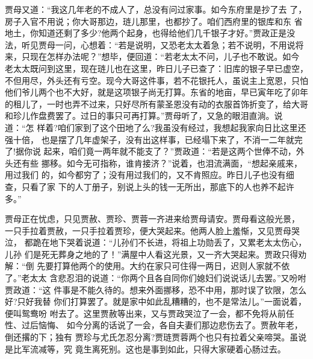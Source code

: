 贾母又道：“我这几年老的不成人了，总没有问过家事。如今东府里是抄了去
了，房子入官不用说；你大哥那边，琏儿那里，也都抄了。咱们西府里的银库和东
省地土，你知道还剩了多少?他两个起身，也得给他们几千银子才好。”贾政正是没
法，听见贾母一问，心想着：“若是说明，又恐老太太着急；若不说明，不用说将
来，只现在怎样办法呢？”想毕，便回道：“若老太太不问，儿子也不敢说。如今
老太太既问到这里，现在琏儿也在这里，昨日儿子已查了：旧库的银子早已虚空，
不但用尽，外头还有亏空。现今大哥这件事，若不花银托人，虽说主上宽恩，只怕
他们爷儿两个也不大好，就是这项银子尚无打算。东省的地亩，早已寅年吃了卯年
的租儿了，一时也弄不过来，只好尽所有蒙圣恩没有动的衣服首饰折变了，给大哥
和珍儿作盘费罢了。过日的事只可再打算。”贾母听了，又急的眼泪直淌。说道：“怎
样着?咱们家到了这个田地了么?我虽没有经过，我想起我家向日比这里还强十倍，
也是摆了几年虚架子，没有出这样事，已经塌下来了，不消一二年就完了!据你说
起来，咱们竟一两年就不能支了？”贾政道：“若是这两个世俸不动，外头还有些
挪移。如今无可指称，谁肯接济？”说着，也泪流满面，“想起亲戚来，用过我们
的，如今都穷了；没有用过我们的，又不肯照应。昨日儿子也没有细查，只看了家
下的人丁册子，别说上头的钱一无所出，那底下的人也养不起许多。”

贾母正在忧虑，只见贾赦、贾珍、贾蓉一齐进来给贾母请安。贾母看这般光景，
一只手拉着贾赦，一只手拉着贾珍，便大哭起来。他两人脸上羞惭，又见贾母哭泣，
都跪在地下哭着说道：“儿孙们不长进，将祖上功勋丢了，又累老太太伤心，儿孙
们是死无葬身之地的了！”满屋中人看这光景，又一齐大哭起来。贾政只得劝解：“倒
先要打算他两个的使用。大约在家只可住得一两日，迟则人家就不依了。”老太太
含悲忍泪的说道：“你两个且各自同你们媳妇们说说话儿去罢。”又吩咐贾政道：“这
件事是不能久待的。想来外面挪移，恐不中用，那时误了钦限，怎么好?只好我替
你们打算罢了。就是家中如此乱糟糟的，也不是常法儿。”一面说着，便叫鸳鸯吩
咐去了。这里贾赦等出来，又与贾政哭泣了一会，都不免将从前任性、过后恼悔、
如今分离的话说了一会，各自夫妻们那边悲伤去了。贾赦年老，倒还撂的下；独有
贾珍与尤氏怎忍分离?贾琏贾蓉两个也只有拉着父亲啼哭。虽说是比军流减等，究
竟生离死别。这也是事到如此，只得大家硬着心肠过去。

